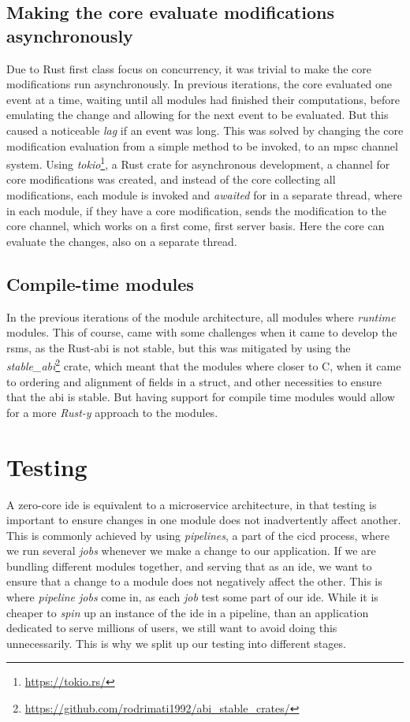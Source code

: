 \subsection{Making the core evaluate modifications asynchronously}

Due to Rust first class focus on concurrency, it was trivial to make the core
modifications run asynchronously. In previous iterations, the core evaluated
one event at a time, waiting until all modules had finished their computations,
before emulating the change and allowing for the next event to be evaluated. But
this caused a noticeable \textit{lag} if an event was long. This was solved by
changing the core modification evaluation from a simple method to be invoked, to
an \gls*{mpsc} channel system. Using \textit{tokio}\footnote{\url{https://tokio.rs/}},
a Rust crate for asynchronous development, a channel for core modifications was
created, and instead of the core collecting all modifications, each module is
invoked and \textit{awaited} for in a separate thread, where in each module, if
they have a core modification, sends the modification to the core channel, which
works on a first come, first server basis. Here the core can evaluate the
changes, also on a separate thread.

\subsection{Compile-time modules}

In the previous iterations of the module architecture, all modules where
\textit{runtime} modules. This of course, came with some challenges when it came
to develop the \gls*{rsms}, as the Rust-\gls*{abi} is not stable, but this was
mitigated by using the \textit{stable\_abi}\footnote{\url{https://github.com/rodrimati1992/abi\_stable\_crates/}}
crate, which meant that the modules where closer to C, when it came to ordering
and alignment of fields in a struct, and other necessities to ensure that the
\gls*{abi} is stable. But having support for compile time modules would allow
for a more \textit{Rust-y} approach to the modules.

\section{Testing} \label{sec:testing}

A zero-core \gls*{ide} is equivalent to a microservice architecture, in that
testing is important to ensure changes in one module does not inadvertently
affect another. This is commonly achieved by using \textit{pipelines}, a part
of the \gls*{cicd} process, where we run several \textit{jobs} whenever we make a
change to our application. If we are bundling different modules together, and
serving that as an \gls*{ide}, we want to ensure that a change to a module does
not negatively affect the other. This is where \textit{pipeline jobs} come in,
as each \textit{job} test some part of our \gls*{ide}. While it is cheaper to
\textit{spin} up an instance of the \gls*{ide} in a pipeline, than an application
dedicated to serve millions of users, we still want to avoid doing this
unnecessarily. This is why we split up our testing into different stages.

